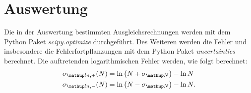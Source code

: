 \section{Auswertung}

Die in der Auswertung bestimmten Ausgleichsrechnungen werden mit
dem Python Paket \emph{scipy.optimize}\cite{scipy} durchgeführt.
Des Weiteren werden die Fehler und insbesondere die Fehlerfortpflanzungen
mit dem Python Paket \emph{uncertainties}\cite{uncertainties} berechnet.
Die auftretenden logarithmischen Fehler werden, wie folgt berechnet:
\begin{align}
  \label{eq:log_fehler}
  \begin{aligned}
    \sigma\ua{ln,+}(N)&=\ln{\left(N+\sigma\ua{N}\right)}-\ln{N}\\%
    \sigma\ua{ln,-}(N)&=\ln{\left(N-\sigma\ua{N}\right)}-\ln{N}.
  \end{aligned}
\end{align}

